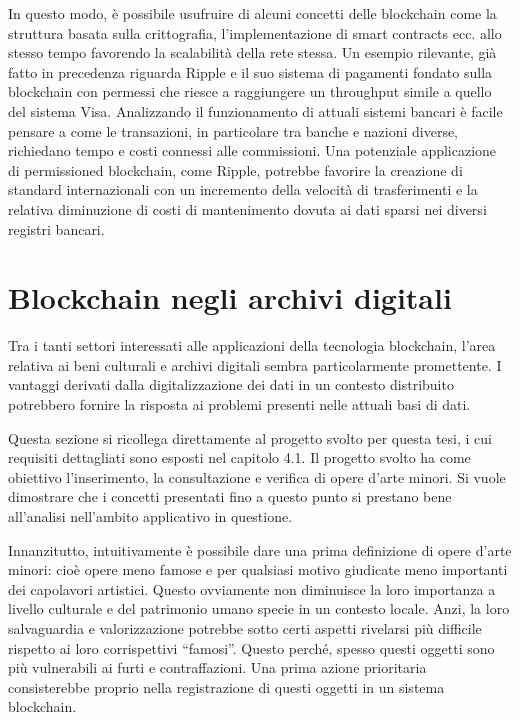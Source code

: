 In questo modo, è possibile usufruire di alcuni concetti delle blockchain come la struttura basata sulla crittografia, l’implementazione di smart contracts ecc. allo stesso tempo favorendo la scalabilità della rete stessa. Un esempio rilevante, già fatto in precedenza riguarda Ripple e il suo sistema di pagamenti fondato sulla blockchain con permessi che riesce a raggiungere un throughput simile a quello del sistema Visa. Analizzando il funzionamento di attuali sistemi bancari è facile pensare a come le transazioni, in particolare tra banche e nazioni diverse, richiedano tempo e costi connessi alle commissioni. Una potenziale applicazione di permissioned blockchain, come Ripple, potrebbe favorire la creazione di standard internazionali con un incremento della velocità di trasferimenti e la relativa diminuzione di costi di mantenimento dovuta ai dati sparsi nei diversi registri bancari.

\section{Blockchain negli archivi digitali} %

Tra i tanti settori interessati alle applicazioni della tecnologia blockchain, l’area relativa ai beni culturali e archivi digitali sembra particolarmente promettente. I vantaggi derivati dalla digitalizzazione dei dati in un contesto distribuito potrebbero fornire la risposta ai problemi presenti nelle attuali basi di dati. 

Questa sezione si ricollega direttamente al progetto svolto per questa tesi, i cui requisiti dettagliati sono esposti nel capitolo 4.1. Il progetto svolto ha come obiettivo l’inserimento, la consultazione e verifica di opere d’arte minori. Si vuole dimostrare che i concetti presentati fino a questo punto si prestano bene all'analisi nell’ambito applicativo in questione.

Innanzitutto, intuitivamente è possibile dare una prima definizione di opere d’arte minori: cioè opere meno famose e per qualsiasi motivo giudicate meno importanti dei capolavori artistici. Questo ovviamente non diminuisce la loro importanza a livello culturale e del patrimonio umano specie in un contesto locale. Anzi, la loro salvaguardia e valorizzazione potrebbe sotto certi aspetti rivelarsi più difficile rispetto ai loro corrispettivi “famosi”. Questo perché, spesso questi oggetti sono più vulnerabili ai furti e contraffazioni. Una prima azione prioritaria consisterebbe proprio nella registrazione di questi oggetti in un sistema blockchain.

